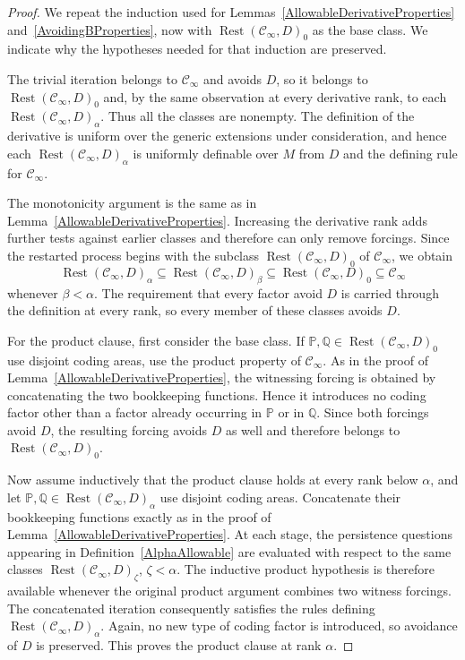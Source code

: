 \documentclass[a4paper,11pt]{article}
\newcommand{\forceP}{\mathbb{P}}
\newcommand{\forceQ}{\mathbb{Q}}
\begin{document}
\begin{proof}
We repeat the induction used for Lemmas~\ref{AllowableDerivativeProperties} and~\ref{AvoidingBProperties}, now with $\operatorname{Rest}(\mathcal C_\infty,D)_0$ as the base class. We indicate why the hypotheses needed for that induction are preserved.

The trivial iteration belongs to $\mathcal C_\infty$ and avoids $D$, so it belongs to $\operatorname{Rest}(\mathcal C_\infty,D)_0$ and, by the same observation at every derivative rank, to each $\operatorname{Rest}(\mathcal C_\infty,D)_\alpha$. Thus all the classes are nonempty. The definition of the derivative is uniform over the generic extensions under consideration, and hence each $\operatorname{Rest}(\mathcal C_\infty,D)_\alpha$ is uniformly definable over $M$ from $D$ and the defining rule for $\mathcal C_\infty$.

The monotonicity argument is the same as in Lemma~\ref{AllowableDerivativeProperties}. Increasing the derivative rank adds further tests against earlier classes and therefore can only remove forcings. Since the restarted process begins with the subclass $\operatorname{Rest}(\mathcal C_\infty,D)_0$ of $\mathcal C_\infty$, we obtain
\[
\operatorname{Rest}(\mathcal C_\infty,D)_\alpha\subseteq\operatorname{Rest}(\mathcal C_\infty,D)_\beta\subseteq\operatorname{Rest}(\mathcal C_\infty,D)_0\subseteq\mathcal C_\infty
\]
whenever $\beta<\alpha$. The requirement that every factor avoid $D$ is carried through the definition at every rank, so every member of these classes avoids $D$.

For the product clause, first consider the base class. If $\forceP,\forceQ\in\operatorname{Rest}(\mathcal C_\infty,D)_0$ use disjoint coding areas, use the product property of $\mathcal C_\infty$. As in the proof of Lemma~\ref{AllowableDerivativeProperties}, the witnessing forcing is obtained by concatenating the two bookkeeping functions. Hence it introduces no coding factor other than a factor already occurring in $\forceP$ or in $\forceQ$. Since both forcings avoid $D$, the resulting forcing avoids $D$ as well and therefore belongs to $\operatorname{Rest}(\mathcal C_\infty,D)_0$.

Now assume inductively that the product clause holds at every rank below $\alpha$, and let $\forceP,\forceQ\in\operatorname{Rest}(\mathcal C_\infty,D)_\alpha$ use disjoint coding areas. Concatenate their bookkeeping functions exactly as in the proof of Lemma~\ref{AllowableDerivativeProperties}. At each stage, the persistence questions appearing in Definition~\ref{AlphaAllowable} are evaluated with respect to the same classes $\operatorname{Rest}(\mathcal C_\infty,D)_\zeta$, $\zeta<\alpha$. The inductive product hypothesis is therefore available whenever the original product argument combines two witness forcings. The concatenated iteration consequently satisfies the rules defining $\operatorname{Rest}(\mathcal C_\infty,D)_\alpha$. Again, no new type of coding factor is introduced, so avoidance of $D$ is preserved. This proves the product clause at rank $\alpha$.


\end{proof}
\end{document}

